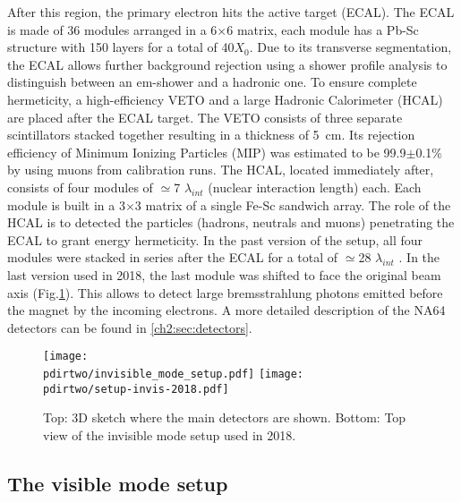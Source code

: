 After this region, the primary electron hits the active target (ECAL). The ECAL is made of 36 modules arranged in a 6$\times$6 matrix, each module has a Pb-Sc structure with 150 layers for a total of 40$X_0$. Due to its transverse segmentation, the ECAL allows further background rejection using a shower profile analysis to distinguish between an em-shower and a hadronic one. To ensure complete hermeticity, a high-efficiency VETO and a large Hadronic Calorimeter (HCAL) are placed after the ECAL target. The VETO consists of three separate scintillators stacked together resulting in a thickness of \SI{5}{\centi\meter}. Its rejection efficiency of Minimum Ionizing Particles (MIP) was estimated to be 99.9$\pm$0.1\% by using muons from calibration runs. The HCAL, located immediately after, consists of four modules of $\simeq$7 $\lambda_{int}$ (nuclear interaction length) each. Each module is built in a 3$\times$3 matrix of a single Fe-Sc sandwich array. The role of the HCAL is to detected the particles (hadrons, neutrals and muons) penetrating the ECAL to grant energy hermeticity. In the past version of the setup, all four modules were stacked in series after the ECAL for a total of $\simeq$28 $\lambda_{int}$ \cite{Banerjee:2016tad}. In the last version used in 2018, the last module was shifted to face the original beam axis (Fig.\ref{fig:setup-invis-2018}). This allows to detect large bremsstrahlung photons emitted before the magnet by the incoming electrons. A more detailed description of the NA64 detectors can be found in \ref{ch2:sec:detectors}.

\begin{figure}[tbh!]
  \centering
  \texttt{[image: \\pdirtwo/invisible\_mode\_setup.pdf]}
\texttt{[image: \\pdirtwo/setup-invis-2018.pdf]}
\caption[Invisible mode setup 2018]{Top: 3D sketch where the main detectors are shown. Bottom: Top view of the invisible mode setup used in 2018.}
\label{fig:setup-invis-2018}
\end{figure}

\subsection{The visible mode setup}
\label{ch2:sec:vismode}

